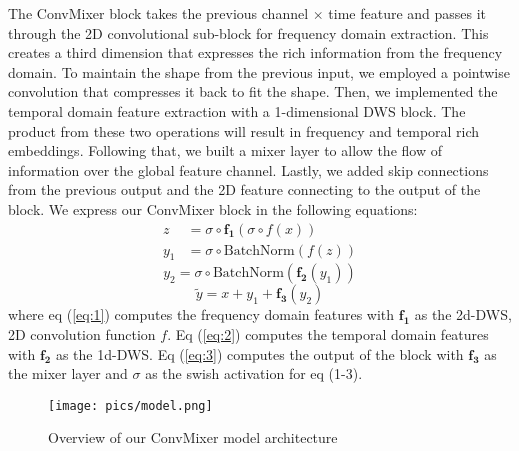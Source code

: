 \documentclass{article}
\begin{document}
The ConvMixer block takes the previous channel $\times$ time feature and passes it through the 2D convolutional sub-block for frequency domain extraction. This creates a third dimension that expresses the rich information from the frequency domain. To maintain the shape from the previous input, we employed a pointwise convolution that compresses it back to fit the shape. Then, we implemented the temporal domain feature extraction with a 1-dimensional DWS block. The product from these two operations will result in frequency and temporal rich embeddings. Following that, we built a mixer layer to allow the flow of information over the global feature channel. Lastly, we added skip connections from the previous output and the 2D feature connecting to the output of the block. We express our ConvMixer block in the following equations: \begin{equation}
\begin{split}
\label{eq:1}
z &= \sigma \circ \boldsymbol{f_1}(\sigma \circ f(x)) \\ 
y_1 &= \sigma \circ \text{BatchNorm} (f(z))
\end{split}
\end{equation}
\begin{equation}
\label{eq:2}
y_2 = \sigma \circ \text{BatchNorm}( \boldsymbol{f_2} (y_1))
\end{equation}
\begin{equation}
\label{eq:3}
\tilde{y} = x + y_1 + \boldsymbol{f_3}(y_2)
\end{equation} where eq (\ref{eq:1}) computes the frequency domain features with $\boldsymbol{f_1}$ as the 2d-DWS, 2D convolution function $f$. Eq (\ref{eq:2}) computes the temporal domain features with $\boldsymbol{f_2}$ as the 1d-DWS. Eq (\ref{eq:3}) computes the output of the block with $\boldsymbol{f_3}$ as the mixer layer and $\sigma$ as the swish activation for eq (1-3).
\begin{figure}[t]
    \centering
    \texttt{[image: pics/model.png]}
    \caption{Overview of our ConvMixer model architecture}
    \label{fig:model}
\end{figure}
\end{document}
